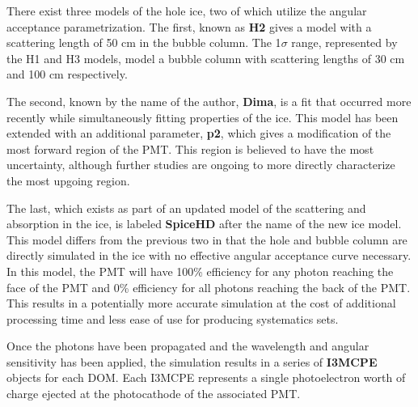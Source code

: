 There exist three models of the hole ice, two of which utilize the angular acceptance parametrization.
The first, known as \textbf{H2} gives a model with a scattering length of 50 cm in the bubble column. 
The 1$\sigma$ range, represented by the H1 and H3 models, model a bubble column with scattering lengths of 30 cm and 100 cm respectively.

The second, known by the name of the author, \textbf{Dima}, is a fit that occurred more recently while simultaneously fitting properties of the ice.
This model has been extended with an additional parameter, \textbf{p2}, which gives a modification of the most forward region of the PMT.
This region is believed to have the most uncertainty, although further studies are ongoing to more directly characterize the most upgoing region.

The last, which exists as part of an updated model of the scattering and absorption in the ice, is labeled \textbf{SpiceHD} after the name of the new ice model. 
This model differs from the previous two in that the hole and bubble column are directly simulated in the ice with no effective angular acceptance curve necessary.
In this model, the PMT will have 100\% efficiency for any photon reaching the face of the PMT and 0\% efficiency for all photons reaching the back of the PMT.
This results in a potentially more accurate simulation at the cost of additional processing time and less ease of use for producing systematics sets.

Once the photons have been propagated and the wavelength and angular sensitivity has been applied, the simulation results in a series of \textbf{I3MCPE} objects for each DOM. Each I3MCPE represents a single photoelectron worth of charge ejected at the photocathode of the associated PMT. 
